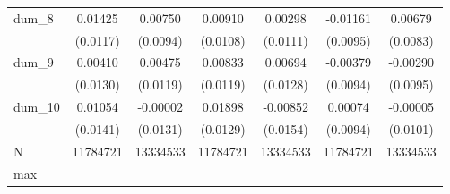 {\begin{tabular}{l*{6}{c}}
dum\_8       &     0.01425         &     0.00750         &     0.00910         &     0.00298         &    -0.01161         &     0.00679         \\
            &    (0.0117)         &    (0.0094)         &    (0.0108)         &    (0.0111)         &    (0.0095)         &    (0.0083)         \\
dum\_9       &     0.00410         &     0.00475         &     0.00833         &     0.00694         &    -0.00379         &    -0.00290         \\
            &    (0.0130)         &    (0.0119)         &    (0.0119)         &    (0.0128)         &    (0.0094)         &    (0.0095)         \\
dum\_10      &     0.01054         &    -0.00002         &     0.01898         &    -0.00852         &     0.00074         &    -0.00005         \\
            &    (0.0141)         &    (0.0131)         &    (0.0129)         &    (0.0154)         &    (0.0094)         &    (0.0101)         \\
\midrule
N           &    11784721         &    13334533         &    11784721         &    13334533         &    11784721         &    13334533         \\
max         &                     &                     &                     &                     &                     &                     \\
\bottomrule
\end{tabular}
}
